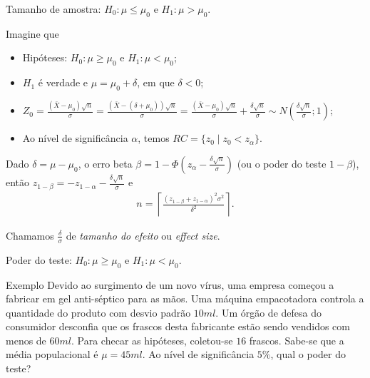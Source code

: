 \documentclass[8pt]{beamer}
\begin{document}
\begin{frame}{Tamanho de amostra: $H_0:\mu \leq \mu_0$ e $H_1: \mu > \mu_0$.}

Imagine que
\begin{itemize}
\item Hipóteses: $H_0: \mu \geq \mu_0$ e $H_1: \mu < \mu_0$;
\item $H_1$ é verdade e $\mu = \mu_0 + \delta$, em que $\delta < 0$;
\item $Z_0 = \frac{(\bar{X} - \mu_0)\sqrt{n}}{\sigma} = \frac{(\bar{X} - (\delta + \mu_0))\sqrt{n}}{\sigma} = \frac{(\bar{X} - \mu_0)\sqrt{n}}{\sigma} + \frac{\delta\sqrt{n}}{\sigma} \sim N\left( \frac{\delta \sqrt{n}}{\sigma}; 1 \right)$;
\item Ao nível de significância $\alpha$, temos $RC = \{ z_0 \mid z_0 < z_{\alpha}   \}$.
\end{itemize}
\vfill

Dado $\delta = \mu - \mu_0$, o erro beta $\beta =1- \Phi\left( z_{\alpha} - \frac{\delta\sqrt{n}}{\sigma} \right)$ (ou o poder do teste $1-\beta$), então $z_{1-\beta} = -z_{1-\alpha} - \frac{\delta\sqrt{n}}{\sigma}$ e 
\begin{align*}
n = \left\lceil \frac{(z_{1-\beta} + z_{1-\alpha})^2 \sigma^2}{\delta^2} \right\rceil.
\end{align*}

Chamamos $\frac{\delta}{\sigma}$  de \textit{tamanho do efeito} ou \textit{effect size}.
\end{frame}

\begin{frame}{Poder do teste: $H_0:\mu \geq \mu_0$ e $H_1: \mu < \mu_0$.}

\large

\begin{block}{Exemplo}
	Devido ao surgimento de um novo vírus, uma empresa começou a fabricar em gel anti-séptico para as mãos. Uma máquina empacotadora controla a quantidade do produto com desvio padrão $10ml$.
	Um órgão de defesa do consumidor desconfia que os frascos desta fabricante estão sendo vendidos com menos de $60ml$.
	Para checar as hipóteses, coletou-se $16$ frascos. Sabe-se que a média populacional é $\mu = 45ml$. Ao nível de significância $5\%$, qual o poder do teste?
\end{block}

\normalsize

\end{frame}
\end{document}
